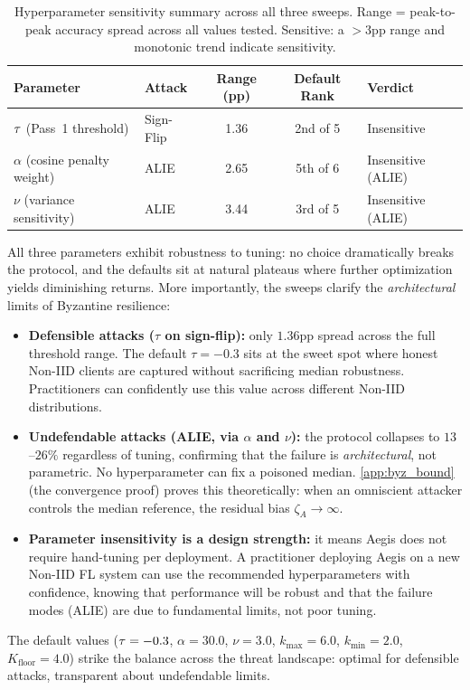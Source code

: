 \documentclass[../main]{subfiles}
\begin{document}
\begin{table}[htbp]
\centering
\caption{Hyperparameter sensitivity summary across all three sweeps.
Range = peak-to-peak accuracy spread across all values tested.
Sensitive: a $>3$pp range and monotonic trend indicate sensitivity.}
\label{tab:app_sweep_summary}
\small
\setlength{\tabcolsep}{5pt}
\begin{tabular}{llccl}
\toprule
\textbf{Parameter} & \textbf{Attack} & \textbf{Range (pp)} & \textbf{Default Rank} & \textbf{Verdict} \\
\midrule
$\tau$ (Pass~1 threshold)      & Sign-Flip & 1.36 & 2nd of 5  & Insensitive \\
$\alpha$ (cosine penalty weight)     & ALIE      & 2.65 & 5th of 6  & Insensitive (ALIE) \\
$\nu$ (variance sensitivity)         & ALIE      & 3.44 & 3rd of 5  & Insensitive (ALIE) \\
\bottomrule
\end{tabular}
\end{table}

All three parameters exhibit robustness to tuning: no choice dramatically breaks the protocol,
and the defaults sit at natural plateaus where further optimization yields diminishing returns.
More importantly, the sweeps clarify the \emph{architectural} limits of Byzantine resilience:

\begin{itemize}
    \item \textbf{Defensible attacks ($\tau$ on sign-flip):} only $1.36$pp spread across the full threshold range.
    The default $\tau = -0.3$ sits at the sweet spot where honest Non-IID clients are captured without sacrificing
    median robustness. Practitioners can confidently use this value across different Non-IID distributions.

    \item \textbf{Undefendable attacks (ALIE, via $\alpha$ and $\nu$):} the protocol collapses to $13$--$26\%$ regardless
    of tuning, confirming that the failure is \emph{architectural}, not parametric. No hyperparameter can fix a poisoned median.
    \cref{app:byz_bound} (the convergence proof) proves this theoretically: when an omniscient attacker controls the
    median reference, the residual bias $\zeta_A \to \infty$.

    \item \textbf{Parameter insensitivity is a design strength:} it means Aegis does not require hand-tuning per deployment.
    A practitioner deploying Aegis on a new Non-IID FL system can use the recommended hyperparameters with confidence,
    knowing that performance will be robust and that the failure modes (ALIE) are due to fundamental limits, not poor tuning.
\end{itemize}

The default values ($\tau = -0.3$, $\alpha = 30.0$, $\nu = 3.0$, $k_{\max} = 6.0$, $k_{\min} = 2.0$, $K_{\text{floor}} = 4.0$)
strike the balance across the threat landscape: optimal for defensible attacks, transparent about undefendable limits.
\end{document}
